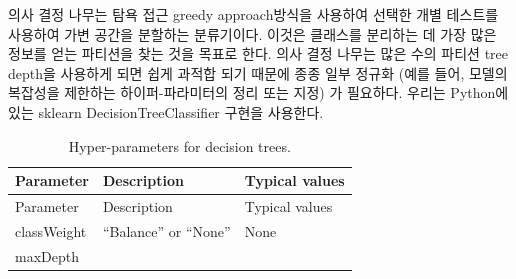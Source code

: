 \documentclass[10.5pt]{book}
\theoremstyle{definition}
\theoremstyle{definition}
\theoremstyle{definition}
\theoremstyle{remark}
\begin{document}
의사 결정 나무는 탐욕 접근 greedy approach방식을 사용하여 선택한 개별
테스트를 사용하여 가변 공간을 분할하는 분류기이다. 이것은 클래스를
분리하는 데 가장 많은 정보를 얻는 파티션을 찾는 것을 목표로 한다. 의사
결정 나무는 많은 수의 파티션 tree depth을 사용하게 되면 쉽게 과적합 되기
때문에 종종 일부 정규화 (예를 들어, 모델의 복잡성을 제한하는
하이퍼-파라미터의 정리 또는 지정) 가 필요하다. 우리는 Python에 있는
sklearn DecisionTreeClassifier 구현을 사용한다. 

\begin{longtable}[]{@{}lll@{}}
\caption{\label{tab:decisionTreeParameters} Hyper-parameters for decision
trees.}\tabularnewline
\toprule
\begin{minipage}[b]{0.13\columnwidth}\raggedright\strut
Parameter\strut
\end{minipage} & \begin{minipage}[b]{0.16\columnwidth}\raggedright\strut
Description\strut
\end{minipage} & \begin{minipage}[b]{0.20\columnwidth}\raggedright\strut
Typical values\strut
\end{minipage}\tabularnewline
\midrule
\endfirsthead
\toprule
\begin{minipage}[b]{0.13\columnwidth}\raggedright\strut
Parameter\strut
\end{minipage} & \begin{minipage}[b]{0.16\columnwidth}\raggedright\strut
Description\strut
\end{minipage} & \begin{minipage}[b]{0.20\columnwidth}\raggedright\strut
Typical values\strut
\end{minipage}\tabularnewline
\midrule
\endhead
\begin{minipage}[t]{0.13\columnwidth}\raggedright\strut
classWeight\strut
\end{minipage} & \begin{minipage}[t]{0.16\columnwidth}\raggedright\strut
``Balance'' or ``None''\strut
\end{minipage} & \begin{minipage}[t]{0.20\columnwidth}\raggedright\strut
None\strut
\end{minipage}\tabularnewline
\begin{minipage}[t]{0.13\columnwidth}\raggedright\strut
maxDepth\strut
\end{minipage} & \begin{minipage}[t]{0.16\columnwidth}\raggedright\strut

\end{minipage}
\end{longtable}
\end{document}
